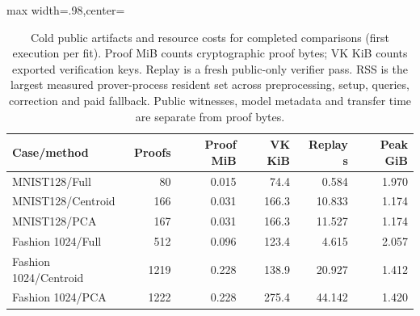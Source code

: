 \begin{table}[tbp]
\centering
\caption{Cold public artifacts and resource costs for completed comparisons (first execution per fit). Proof MiB counts cryptographic proof bytes; VK KiB counts exported verification keys. Replay is a fresh public-only verifier pass. RSS is the largest measured prover-process resident set across preprocessing, setup, queries, correction and paid fallback. Public witnesses, model metadata and transfer time are separate from proof bytes.}
\label{tab:review-resources}
\begin{adjustbox}{max width=.98\textwidth,center=\textwidth}
\begin{tabular}{lrrrrr}
\toprule
Case/method & Proofs & Proof MiB & VK KiB & Replay s & Peak GiB\\
\midrule
MNIST128/Full & 80 & 0.015 & 74.4 & 0.584 & 1.970\\
MNIST128/Centroid & 166 & 0.031 & 166.3 & 10.833 & 1.174\\
MNIST128/PCA & 167 & 0.031 & 166.3 & 11.527 & 1.174\\
Fashion 1024/Full & 512 & 0.096 & 123.4 & 4.615 & 2.057\\
Fashion 1024/Centroid & 1219 & 0.228 & 138.9 & 20.927 & 1.412\\
Fashion 1024/PCA & 1222 & 0.228 & 275.4 & 44.142 & 1.420\\
\bottomrule
\end{tabular}
\end{adjustbox}
\end{table}
